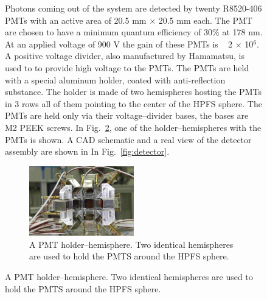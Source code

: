 \begin{figure}[h]
Photons coming out of the system are detected by twenty R8520-406 PMTs with an 
active area of 20.5 mm $\times$ 20.5 mm each. 
The PMT are chosen to have a minimum 
quantum efficiency of 30\% at 178 nm. At an applied voltage of 900 
V the gain of these PMTs is ~ 2 $\times$ 10$^6$. A positive voltage divider, 
also manufactured by Hamamatsu,  is used to to provide high voltage to the PMTs. 
The PMTs are held with a special aluminum holder, coated with anti-reflection substance. 
The holder is made of two hemispheres hosting the PMTs in 3 rows all of them pointing to the 
center of the HPFS sphere. The PMTs are held only via their voltage--divider bases,  
the bases are  M2 PEEK screws. 
In Fig.~\ref{fig:pmtholder}, one of the holder--hemispheres with the 
PMTs is shown. A CAD schematic and a real view of the detector assembly are shown 
in In Fig.~\ref{fig:detector}.

\begin{figure}[h]
   \centering
   \includegraphics[width=0.5\textwidth]{PMTholder.JPG}
   \caption{A PMT holder--hemisphere. Two identical hemispheres are used to hold 
   the PMTS around the HPFS sphere.} 
   \label{fig:pmtholder}
\end{figure}


\end{figure}
